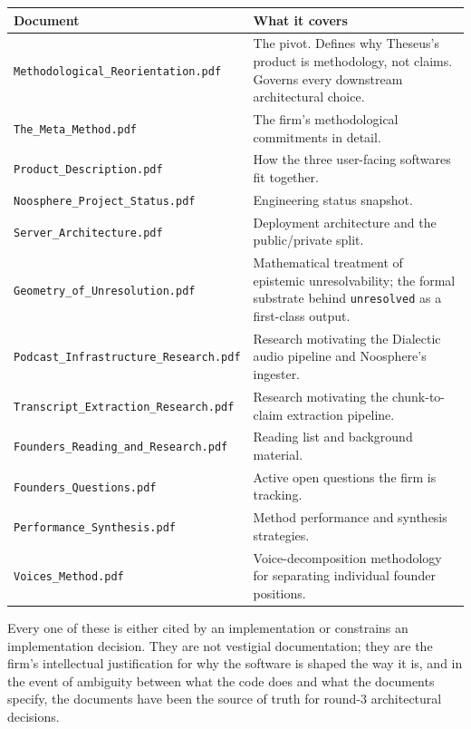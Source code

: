 \documentclass[11pt,letterpaper]{article}
\newcommand{\file}[1]{\texttt{#1}}
\begin{document}
\begin{longtable}{p{5cm} p{9.5cm}}
\toprule
\textbf{Document} & \textbf{What it covers} \\
\midrule
\endhead
\file{Methodological\_Reorientation.pdf} & The pivot. Defines why Theseus's product is methodology, not claims. Governs every downstream architectural choice. \\
\file{The\_Meta\_Method.pdf}             & The firm's methodological commitments in detail. \\
\file{Product\_Description.pdf}          & How the three user-facing softwares fit together. \\
\file{Noosphere\_Project\_Status.pdf}    & Engineering status snapshot. \\
\file{Server\_Architecture.pdf}          & Deployment architecture and the public/private split. \\
\file{Geometry\_of\_Unresolution.pdf}    & Mathematical treatment of epistemic unresolvability; the formal substrate behind \texttt{unresolved} as a first-class output. \\
\file{Podcast\_Infrastructure\_Research.pdf} & Research motivating the Dialectic audio pipeline and Noosphere's ingester. \\
\file{Transcript\_Extraction\_Research.pdf}  & Research motivating the chunk-to-claim extraction pipeline. \\
\file{Founders\_Reading\_and\_Research.pdf}  & Reading list and background material. \\
\file{Founders\_Questions.pdf}           & Active open questions the firm is tracking. \\
\file{Performance\_Synthesis.pdf}        & Method performance and synthesis strategies. \\
\file{Voices\_Method.pdf}               & Voice-decomposition methodology for separating individual founder positions. \\
\bottomrule
\end{longtable}

Every one of these is either cited by an implementation or constrains an implementation decision. They are not vestigial documentation; they are the firm's intellectual justification for why the software is shaped the way it is, and in the event of ambiguity between what the code does and what the documents specify, the documents have been the source of truth for round-3 architectural decisions.
\end{document}
